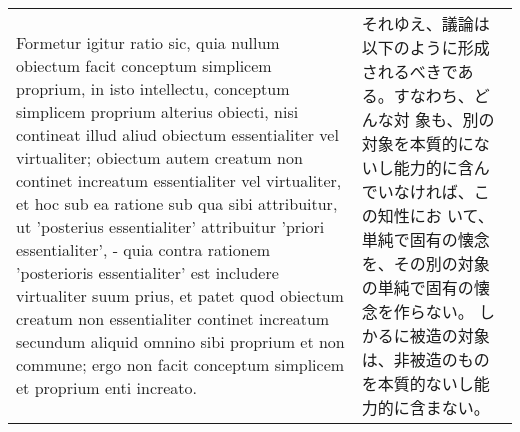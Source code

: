 \documentclass[paper=a4paper,fontsize=10pt,jafontsize=9pt,titlepage]{jlreq}
\begin{document}
\begin{longtable}{p{21em}p{21em}}
 
 \\
 

 Formetur igitur ratio sic, quia nullum obiectum
 facit conceptum simplicem proprium, in isto intellectu, conceptum
 simplicem proprium alterius obiecti, nisi contineat illud aliud
 obiectum essentialiter vel virtualiter; obiectum autem creatum non
 continet increatum essentialiter vel virtualiter, et hoc sub ea
 ratione sub qua sibi attribuitur, ut 'posterius essentialiter'
 attribuitur 'priori essentialiter', - quia contra rationem
 'posterioris essentialiter' est includere virtualiter suum prius, et
 patet quod obiectum creatum non essentialiter continet increatum
 secundum aliquid omnino sibi proprium et non commune; ergo non facit
 conceptum simplicem et proprium enti increato.

 &

 それゆえ、議論は以下のように形成されるべきである。すなわち、どんな対
 象も、別の対象を本質的にないし能力的に含んでいなければ、この知性にお
 いて、単純で固有の懐念を、その別の対象の単純で固有の懐念を作らない。
 しかるに被造の対象は、非被造のものを本質的ないし能力的に含まない。
 



 
\end{longtable}
\end{document}
